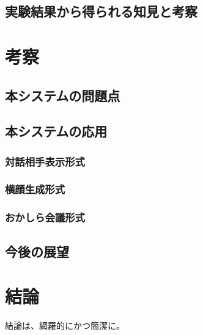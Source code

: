\documentclass[a4j,11pt,oneside,openany,report]{jsbook}
\begin{document}
\section{実験結果から得られる知見と考察}

\chapter{考察}
\section{本システムの問題点}
\section{本システムの応用}
  \subsection{対話相手表示形式}
  \subsection{横顔生成形式}
  \subsection{おかしら会議形式}
\section{今後の展望}



\chapter{結論}
結論は、網羅的にかつ簡潔に。



\end{document}
